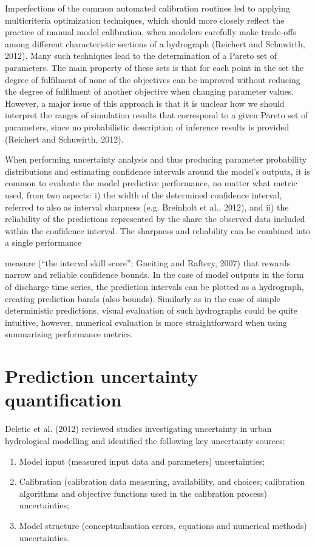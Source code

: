 \documentclass{ctuthesis}\usepackage[]{graphicx}\usepackage[]{color}
\begin{document}
Imperfections of the common automated calibration routines led to applying multicriteria
optimization techniques, which should more closely reflect the practice of manual model calibration,
when modelers carefully make trade‐offs among different characteristic sections of a hydrograph
(Reichert and Schuwirth, 2012). Many such techniques lead to the determination of a Pareto set of
parameters. The main property of these sets is that for each point in the set the degree of fulfilment
of none of the objectives can be improved without reducing the degree of fulfilment of another
objective when changing parameter values. However, a major issue of this approach is that it is
unclear how we should interpret the ranges of simulation results that correspond to a given Pareto
set of parameters, since no probabilistic description of inference results is provided (Reichert and
Schuwirth, 2012).

When performing uncertainty analysis and thus producing parameter probability distributions and
estimating confidence intervals around the model’s outputs, it is common to evaluate the model
predictive performance, no matter what metric used, from two aspects: i) the width of the
determined confidence interval, referred to also as interval sharpness (e.g. Breinholt et al., 2012),
and ii) the reliability of the predictions represented by the share the observed data included within
the confidence interval. The sharpness and reliability can be combined into a single performance

measure (“the interval skill score”; Gneiting and Raftery, 2007) that rewards narrow and reliable
confidence bounds. In the case of model outputs in the form of discharge time series, the prediction
intervals can be plotted as a hydrograph, creating prediction bands (also bounds). Similarly as in the
case of simple deterministic predictions, visual evaluation of such hydrographs could be quite
intuitive, however, numerical evaluation is more straightforward when using summarizing
performance metrics.



\section{Prediction uncertainty quantification} \label{PredUncQuant}

Deletic et al. (2012) reviewed studies investigating uncertainty in urban hydrological modelling and identified the following key uncertainty sources:
\begin{enumerate}
        \item Model input (measured input data and parameters) uncertainties;
        \item Calibration (calibration data measuring, availability, and choices; calibration algorithms and objective functions used in the calibration process) uncertainties;
        \item Model structure (conceptualisation errors, equations and numerical methods) uncertainties. 
\end{enumerate}
\end{document}
